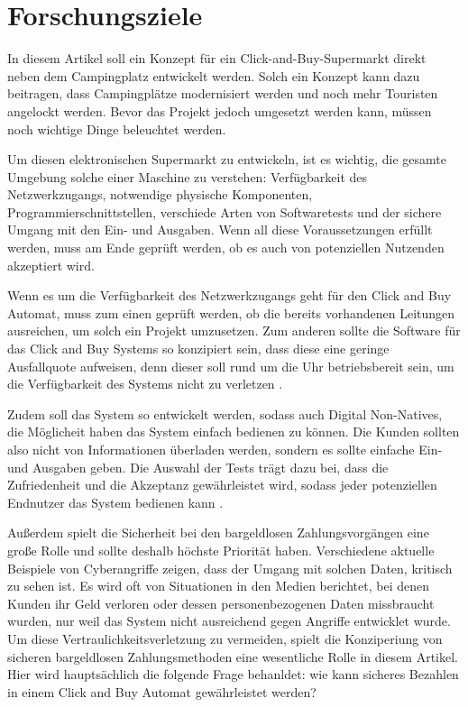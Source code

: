 \section{Forschungsziele}


In diesem Artikel soll ein Konzept für ein Click-and-Buy-Supermarkt direkt neben dem Campingplatz 
entwickelt werden. Solch ein Konzept kann dazu beitragen, dass Campingplätze modernisiert werden 
und noch mehr Touristen angelockt werden. Bevor das Projekt jedoch umgesetzt werden kann, müssen 
noch wichtige Dinge beleuchtet werden. 

Um diesen elektronischen Supermarkt zu entwickeln, ist es wichtig, die gesamte Umgebung solche einer Maschine
zu verstehen: Verfügbarkeit des Netzwerkzugangs, notwendige physische Komponenten, Programmierschnittstellen,
verschiede Arten von Softwaretests und der sichere Umgang mit den Ein- und Ausgaben. Wenn all diese 
Voraussetzungen erfüllt werden, muss am Ende geprüft werden, ob es auch von potenziellen Nutzenden 
akzeptiert wird. 

Wenn es um die Verfügbarkeit des Netzwerkzugangs geht für den Click and Buy Automat, muss zum einen 
geprüft werden, ob die bereits vorhandenen Leitungen ausreichen, um solch ein Projekt umzusetzen. Zum anderen 
sollte die Software für das Click and Buy Systems so konzipiert sein, dass diese eine geringe Ausfallquote
aufweisen, denn dieser soll rund um die Uhr betriebsbereit sein, um die Verfügbarkeit des Systems nicht zu
verletzen \cite{refbook:SWIS}.

Zudem soll das System so entwickelt werden, sodass auch Digital Non-Natives, die Möglicheit haben
das System einfach bedienen zu können. Die Kunden sollten also nicht von Informationen überladen werden, 
sondern es sollte einfache Ein- und Ausgaben geben. Die Auswahl der Tests trägt dazu bei, dass die 
Zufriedenheit und die Akzeptanz gewährleistet wird, sodass jeder potenziellen Endnutzer das System bedienen
kann \cite{refbook:IASE}.

Außerdem spielt die Sicherheit bei den bargeldlosen Zahlungsvorgängen eine große Rolle und sollte deshalb 
höchste Priorität haben. Verschiedene aktuelle Beispiele von Cyberangriffe zeigen, dass der Umgang mit solchen 
Daten, kritisch zu sehen ist. Es wird oft von Situationen in den Medien berichtet, bei denen Kunden ihr
Geld verloren oder dessen personenbezogenen Daten missbraucht wurden, nur weil das System nicht ausreichend 
gegen Angriffe entwicklet wurde. Um diese Vertraulichkeitsverletzung zu vermeiden, spielt die Konziperiung 
von sicheren bargeldlosen Zahlungsmethoden eine wesentliche Rolle in diesem Artikel. Hier wird hauptsächlich
die folgende Frage behanldet: wie kann sicheres Bezahlen in einem Click and Buy Automat gewährleistet werden?